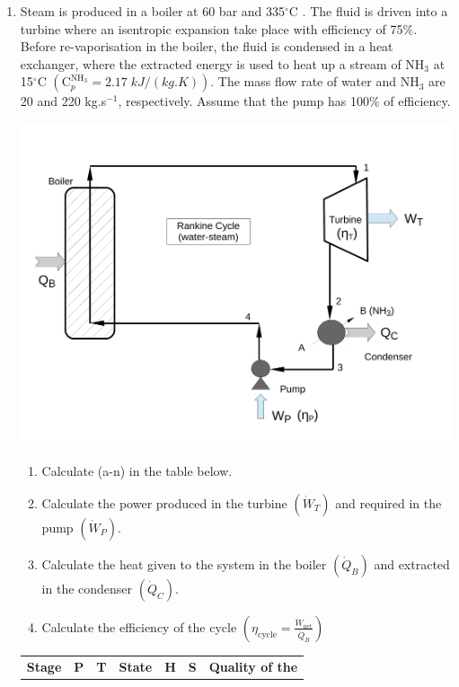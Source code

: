 \documentclass[12pts,a4paper,amsmath,amssymb,floatfix]{article}%
\newcommand{\frc}{\displaystyle\frac}
\begin{document}
\begin{enumerate}[label=\bfseries Problem \arabic*:]
\item\label{SolvedExample2} Steam is produced in a boiler at 60 bar and 335$^{\circ}$C . The fluid is driven into a turbine where an isentropic expansion take place with efficiency of 75$\%$. Before re-vaporisation in the boiler, the fluid is condensed in a heat exchanger, where the extracted energy is used to heat up a stream of NH$_{3}$ at 15$^{\circ}$C $\left(\text{C}_{p}^{\text{NH}_{3}}=2.17\; kJ/(kg.K)\right)$. The mass flow rate of water and NH$_{3}$ are 20 and 220 kg.s$^{-1}$, respectively. Assume that the pump has 100$\%$ of efficiency.
\begin{center}
\includegraphics[width=12.cm,height=8.cm,clip]{./../Pics/RankineCycle2}
\label{exam_mod02_rankinecycle}
\end{center}
\begin{enumerate}
\item Calculate (a-n) in the table below.
\item Calculate the power produced in the turbine $\left(\dot{W}_{T}\right)$ and required in the pump $\left(\dot{W}_{P}\right)$.
\item Calculate the heat given to the system in the boiler $\left(\dot{Q}_{B}\right)$ and extracted in the condenser $\left(\dot{Q}_{C}\right)$.
\item Calculate the efficiency of the cycle $\left(\eta_{\text{cycle}}=\frc{\dot{W}_{\text{net}}}{\dot{Q}_{B}}\right)$
\end{enumerate}
\begin{center}
\begin{tabular} {||c | c c c c c c || }
\hline\hline
{\bf Stage} & {\bf P}    & {\bf T}        & {\bf State}    & {\bf H}             & {\bf S}                 &  {\bf Quality of the} \\

\end{tabular}
\end{center}
\end{enumerate}
\end{document}
